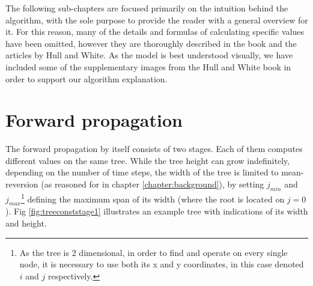 The following sub-chapters are focused primarily on the intuition behind the algorithm, with the sole purpose to provide the reader with a general overview for it. For this reason, many of the details and formulas of calculating specific values have been omitted, however they are thoroughly described in the book and the articles by Hull and White. As the model is best understood visually, we have included some of the supplementary images from the Hull and White book in order to support our algorithm explanation. 

\section{Forward propagation}
The forward propagation by itself consists of two stages. Each of them computes different values on the same tree. While the tree height can grow indefinitely, depending on the number of time steps, the width of the tree is limited to mean-reversion (as reasoned for in chapter \ref{chapter:background}), by setting $j_{min}$ and $j_{max}$\footnote{As the tree is 2 dimensional, in order to find and operate on every single node, it is necessary to use both its x and y coordinates, in this case denoted $i$ and $j$ respectively.} defining the maximum span of its width (where the root is located on $j=0$). Fig \ref{fig:treeconststage1} illustrates an example tree with indications of its width and height. 

